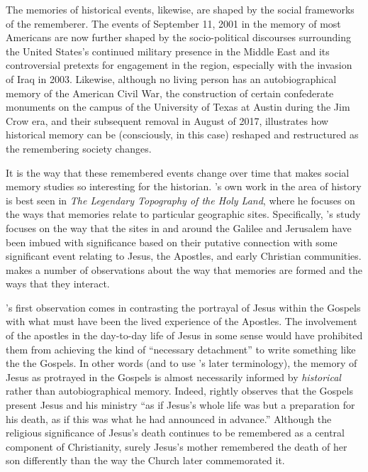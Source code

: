 The memories of historical events, likewise, are shaped by the social
frameworks of the rememberer. The events of September 11, 2001 in the
memory of most Americans are now further shaped by the socio-political
discourses surrounding the United States's continued military presence
in the Middle East and its controversial pretexts for engagement in the
region, especially with the invasion of Iraq in 2003. Likewise, although
no living person has an autobiographical memory of the American Civil
War, the construction of certain confederate monuments on the campus of
the University of Texas at Austin during the Jim Crow era, and their
subsequent removal in August of 2017, illustrates how historical memory
can be (consciously, in this case) reshaped and restructured as the
remembering society changes.

It is the way that these remembered events change over time that makes
social memory studies so interesting for the historian.
\halbwachs's own work in the area of history is best
seen in \emph{The Legendary Topography of the Holy Land}, where he
focuses on the ways that memories relate to particular geographic sites.
Specifically, \halbwachs's study focuses on the way that
the sites in and around the Galilee and Jerusalem have been imbued with
significance based on their putative connection with some significant
event relating to Jesus, the Apostles, and early Christian communities.
\halbwachs makes a number of observations about the way
that memories are formed and the ways that they interact.

\halbwachs's first observation comes in contrasting the
portrayal of Jesus within the Gospels with what must have been the lived
experience of the Apostles.\autocite[193--198]{halbwachs1992} The
involvement of the apostles in the day-to-day life of Jesus in some
sense would have prohibited them from achieving the kind of ``necessary
detachment'' to write something like the the Gospels. In other words
(and to use \halbwachs's later terminology), the memory
of Jesus as protrayed in the Gospels is almost necessarily informed by
\emph{historical} rather than autobiographical
memory.\autocite[194]{halbwachs1992} Indeed, \halbwachs
rightly observes that the Gospels present Jesus and his ministry ``as if
Jesus's whole life was but a preparation for his death, as if this was
what he had announced in advance.''\autocite[198]{halbwachs1992}
Although the religious significance of Jesus's death continues to be
remembered as a central component of Christianity, surely Jesus's mother
remembered the death of her son differently than the way the Church
later commemorated it.\autocites[Regardless of whether
\halbwachs's conception of Early Christianity would be
considered sound today, the idea that the Gospels represent several
collective remembrances of Jesus's life, ministry and death each bearing
marks from their own \emph{Sitz im Leben} (to borrow from the form
critics) seems relatively uncontroversial. A number of studies on the
Jesus and early Christian memory have come about in the past several
years. See][]{ledonne2009}{rodriguez2010}[For an overview of the modern
impact of \halbwachs (and memory studies more generally)
on the field of Historical Jesus studies,
see][]{keith_ec2015}[and][]{keith_ec2015b}

